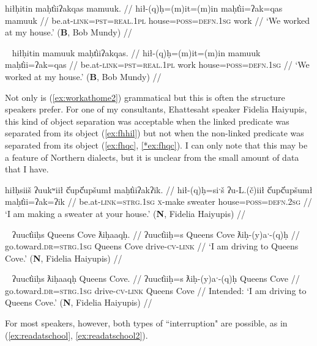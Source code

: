 \ex \label{ex:workathome}
\begingl
\glpreamble hiłḥitin maḥt̓iiʔakqas mamuuk. //
\gla hił-(q)ḥ=(m)it=(m)in maḥt̓ii=ʔak=qas mamuuk //
\glb be.at-\textsc{link}=\textsc{pst}=\textsc{real.1pl} house=\textsc{poss}=\textsc{defn.1sg} work //
\glft `We worked at my house.' (\textbf{B}, Bob Mundy) //
\endgl
\xe

\ex~ \label{ex:workathome2}
\begingl
\glpreamble hiłḥitin mamuuk maḥt̓iiʔakqas. //
\gla hił-(q)ḥ=(m)it=(m)in mamuuk maḥt̓ii=ʔak=qas //
\glb be.at-\textsc{link}=\textsc{pst}=\textsc{real.1pl} work house=\textsc{poss}=\textsc{defn.1sg} //
\glft `We worked at my house.' (\textbf{B}, Bob Mundy) //
\endgl
\xe

Not only is (\ref{ex:workathome2}) grammatical but this is often the structure speakers prefer. For one of my consultants, Ehattesaht speaker Fidelia Haiyupis, this kind of object separation was acceptable when the linked predicate was separated from its object (\ref{ex:fhhil}) but not when the non-linked predicate was separated from its object (\ref{ex:fhqc}, \ref{*ex:fhqc}). I can only note that this may be a feature of Northern dialects, but it is unclear from the small amount of data that I have. %

\ex \label{ex:fhhil}
\begingl
\glpreamble hiłḥsiiš ʔuukʷiił č̓upč̓upšumł maḥt̓iiʔakʔik. //
\gla hił-(q)ḥ=siˑš ʔu-L.(č)iił č̓upč̓upšumł maḥt̓ii=ʔak=ʔik //
\glb be.at-\textsc{link}=\textsc{strg.1sg} \textsc{x}-make sweater house=\textsc{poss}=\textsc{defn.2sg} //
\glft `I am making a sweater at your house.' (\textbf{N}, Fidelia Haiyupis) //
\endgl
\xe

\ex~ \label{ex:fhqc}
\begingl
\glpreamble ʔuuct̓iiḥs Queens Cove ƛiḥaaqḥ. //
\gla ʔuuct̓iiḥ=s Queens Cove ƛiḥ-(y)aˑ-(q)ḥ //
\glb go.toward.\textsc{dr}=\textsc{strg.1sg} Queens Cove drive-\textsc{cv}-\textsc{link} //
\glft `I am driving to Queens Cove.' (\textbf{N}, Fidelia Haiyupis) //
\endgl
\xe

\ex~ \label{*ex:fhqc}
\begingl
\glpreamble *ʔuuct̓iiḥs ƛiḥaaqḥ Queens Cove. //
\gla ʔuuct̓iiḥ=s ƛiḥ-(y)aˑ-(q)ḥ Queens Cove //
\glb go.toward.\textsc{dr}=\textsc{strg.1sg} drive-\textsc{cv}-\textsc{link} Queens Cove //
\glft Intended: `I am driving to Queens Cove.' (\textbf{N}, Fidelia Haiyupis) //
\endgl
\xe

\noindent For most speakers, however, both types of ``interruption" are possible, as in (\ref{ex:readatschool}, \ref{ex:readatschool2}).


